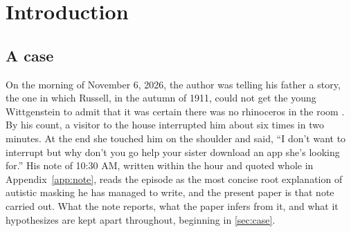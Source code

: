 \begin{abstract}
\end{abstract}

\section{Introduction}

\subsection{A case}

On the morning of November 6, 2026, the author was telling his father a story, the one in which Russell, in the autumn of 1911, could not get the young Wittgenstein to admit that it was certain there was no rhinoceros in the room \cite{MacDonald1993}. By his count, a visitor to the house interrupted him about six times in two minutes. At the end she touched him on the shoulder and said, ``I don't want to interrupt but why don't you go help your sister download an app she's looking for.'' His note of 10:30 AM, written within the hour and quoted whole in Appendix~\ref{app:note}, reads the episode as the most concise root explanation of autistic masking he has managed to write, and the present paper is that note carried out. What the note reports, what the paper infers from it, and what it hypothesizes are kept apart throughout, beginning in \autoref{sec:case}.

